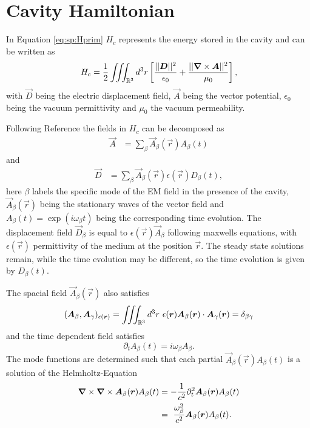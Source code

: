\section{Cavity Hamiltonian}
\label{ssec:sp:Hc}

In Equation \eqref{eq:sp:Hprim} $H_c$ represents the energy stored in the cavity 
    and can be written as
\begin{equation}
    H_c = \frac 1 2 \iiint_{\mathbb{R}^3} d^3 r \left[ 
        \frac{||\bm{D}||^2}{\epsilon_0} 
        + \frac{||\bm{\nabla} \times \bm{A}||^2}{\mu_0} 
    \right],
\end{equation}
with $\vec D$ being the electric displacement field, 
    $\vec A$ being the vector potential,
    $\epsilon_0$ being the vacuum permittivity and $\mu_0$ the vacuum permeability.

Following Reference \cite{Maurer_2023} the fields in $H_c$ can be decomposed as
\begin{align}
\label{eq:sp:decomp:1}
    \vec A &= \sum_\beta \vec A_\beta(\vec r) A_\beta(t)
\end{align}
    and 
\begin{align}
    \vec D &=  \sum_\beta \vec A_\beta(\vec r) \epsilon(\vec r)D_\beta(t),
\label{eq:sp:decomp:2}
\end{align} 
here $\beta$ labels the specific mode of the EM field in the presence of the cavity,
    $\vec A_\beta(\vec r)$ being the stationary waves of the vector field 
    and $A_\beta(t) = \exp(i\omega_\beta t)$ being the corresponding time evolution.
The displacement field $\vec D_\beta$ is equal to $\epsilon(\vec r) \vec A_\beta$ following maxwells equations,
    with $\epsilon(\vec r)$ permittivity of the medium at the position $\vec r$.
The steady state solutions remain, 
    while the time evolution may be different, so the time evolution is given by $D_\beta(t)$.

The spacial field $\vec A_\beta(\vec r)$ also satisfies
\begin{equation}
    (\bm{A} _\beta, \bm{A}_\gamma)_{\epsilon(\bm{r})} 
        = \iiint_{\mathbb{R}^3} d^3 r~
            \epsilon(\bm{r}) \bm{A}_\beta(\bm{r}) \cdot \bm{A}_\gamma(\bm{r})
        = \delta_{\beta\gamma}
\end{equation}
    and the time dependent field satisfies
\begin{equation}
    \partial_tA_\beta(t) = i\omega_\beta A_\beta.
\end{equation}
The mode functions are determined such that each partial $\vec A_\beta(\vec r) A_\beta(t)$ is a solution of the Helmholtz-Equation
\begin{align}
    \bm{\nabla} \times \bm{\nabla} \times \bm{A}_\beta(\bm{r}) A_\beta(t) &=
       -\frac1 {c^2} \partial_t^2 \bm{A}_\beta(\bm{r}) A_\beta(t) \\
        &=~ \frac{\omega_\beta^2}{c^2} \bm{A}_\beta(\bm{r}) A_\beta(t).
\end{align}

